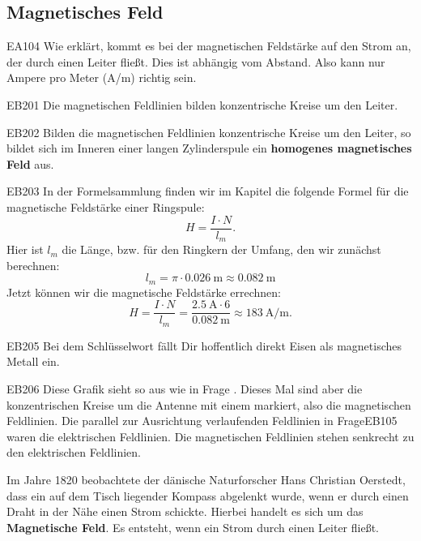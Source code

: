 \subsection{Magnetisches Feld}
\begin{sol}{EA104}
  Wie erklärt, kommt es bei der magnetischen Feldstärke auf den Strom an, der durch einen Leiter fließt. Dies ist abhängig vom Abstand.
  Also kann nur Ampere pro Meter (A/m) richtig sein.   
\end{sol}
\begin{sol}{EB201}
  Die magnetischen Feldlinien bilden konzentrische Kreise um den Leiter.
\end{sol}

\begin{sol}{EB202}
Bilden die magnetischen Feldlinien konzentrische Kreise um den Leiter, so bildet sich im Inneren einer langen Zylinderspule ein \textbf{homogenes magnetisches Feld} aus.
\end{sol}

\begin{sol}{EB203}
  In der Formelsammlung finden wir im Kapitel  die folgende Formel 
  für die magnetische Feldstärke einer Ringspule:
  $$H = \frac{I\cdot N}{l_m}.$$
Hier ist $l_m$ die Länge, bzw. für den Ringkern der Umfang, den wir zunächst berechnen:
$$l_m = \pi \cdot \SI{0.026}{\meter} \approx \SI{0.082}{\meter}$$  
Jetzt können wir die magnetische Feldstärke errechnen:
$$H = \frac{I\cdot N}{l_m} = \frac{\SI{2.5}{\ampere} \cdot 6}{\SI{0.082}{\meter}} \approx \SI{183}{\ampere\per\meter}. $$

\end{sol}

\begin{sol}{EB205}
  Bei dem Schlüsselwort  fällt Dir hoffentlich direkt Eisen als magnetisches Metall ein.
\end{sol}
  
\begin{sol}{EB206}
  Diese Grafik sieht so aus wie in Frage . Dieses Mal sind aber die konzentrischen Kreise um die Antenne mit einem  markiert, also die magnetischen Feldlinien. Die parallel zur Ausrichtung verlaufenden Feldlinien in Frage{EB105} waren die elektrischen Feldlinien. Die magnetischen Feldlinien stehen senkrecht zu den elektrischen Feldlinien. 
\end{sol}

\begin{ohmchapter}
  Im Jahre 1820 beobachtete der dänische Naturforscher Hans Christian Oerstedt, dass ein auf dem Tisch liegender Kompass abgelenkt wurde, wenn er durch einen Draht in der Nähe einen Strom schickte. Hierbei handelt es sich um das \textbf{Magnetische Feld}. Es entsteht, wenn ein Strom durch einen Leiter fließt.
\end{ohmchapter}   


